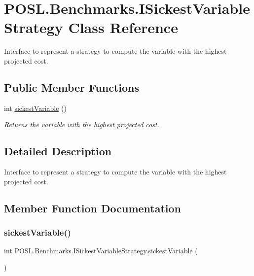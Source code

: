 \hypertarget{interfacePOSL_1_1Benchmarks_1_1ISickestVariableStrategy}{}\section{P\+O\+S\+L.\+Benchmarks.\+I\+Sickest\+Variable\+Strategy Class Reference}
\label{interfacePOSL_1_1Benchmarks_1_1ISickestVariableStrategy}


Interface to represent a strategy to compute the variable with the highest projected cost.  


\subsection*{Public Member Functions}
\begin{DoxyCompactItemize}
\item 
int \hyperlink{interfacePOSL_1_1Benchmarks_1_1ISickestVariableStrategy_a32b331ff755030c8404e2a0a174c6bcd}{sickest\+Variable} ()
\begin{DoxyCompactList}\small\item\em Returns the variable with the highest projected cost. \end{DoxyCompactList}\end{DoxyCompactItemize}


\subsection{Detailed Description}
Interface to represent a strategy to compute the variable with the highest projected cost. 

\subsection{Member Function Documentation}
\mbox{\label{interfacePOSL_1_1Benchmarks_1_1ISickestVariableStrategy_a32b331ff755030c8404e2a0a174c6bcd}} 
\subsubsection{\texorpdfstring{sickest\+Variable()}{sickestVariable()}}
{\footnotesize\ttfamily int P\+O\+S\+L.\+Benchmarks.\+I\+Sickest\+Variable\+Strategy.\+sickest\+Variable (\begin{DoxyParamCaption}{ }\end{DoxyParamCaption})}



